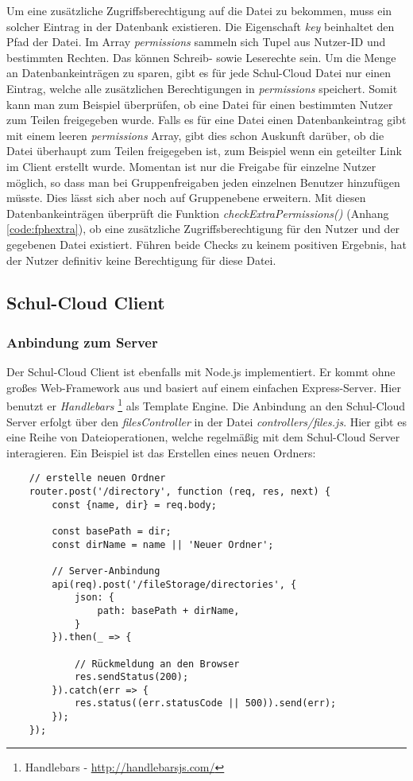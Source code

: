 Um eine zusätzliche Zugriffsberechtigung auf die Datei zu bekommen, muss ein solcher Eintrag in der Datenbank existieren. Die Eigenschaft \textit{key} beinhaltet den Pfad der Datei. Im Array \textit{permissions} sammeln sich Tupel aus Nutzer-ID und bestimmten Rechten. Das können Schreib- sowie Leserechte sein. Um die Menge an Datenbankeinträgen zu sparen, gibt es für jede Schul-Cloud Datei nur einen Eintrag, welche alle zusätzlichen Berechtigungen in \textit{permissions} speichert. Somit kann man zum Beispiel überprüfen, ob eine Datei für einen bestimmten Nutzer zum Teilen freigegeben wurde. Falls es für eine Datei einen Datenbankeintrag gibt mit einem leeren \textit{permissions} Array, gibt dies schon Auskunft darüber, ob die Datei überhaupt zum Teilen freigegeben ist, zum Beispiel wenn ein geteilter Link im Client erstellt wurde. Momentan ist nur die Freigabe für einzelne Nutzer möglich, so dass man bei Gruppenfreigaben jeden einzelnen Benutzer hinzufügen müsste. Dies lässt sich aber noch auf Gruppenebene erweitern. Mit diesen Datenbankeinträgen überprüft die Funktion \textit{checkExtraPermissions()} (Anhang \ref{code:fphextra}), ob eine zusätzliche Zugriffsberechtigung für den Nutzer und der gegebenen Datei existiert. Führen beide Checks zu keinem positiven Ergebnis, hat der Nutzer definitiv keine Berechtigung für diese Datei.

\subsection{Schul-Cloud Client}

\subsubsection{Anbindung zum Server}
Der Schul-Cloud Client ist ebenfalls mit Node.js implementiert. Er kommt ohne großes Web-Framework aus und basiert auf einem einfachen Express-Server. Hier benutzt er \textit{Handlebars} \footnote{Handlebars - \url{http://handlebarsjs.com/}} als Template Engine. Die Anbindung an den Schul-Cloud Server erfolgt über den \textit{filesController} in der  Datei \textit{controllers/files.js}. Hier gibt es eine Reihe von Dateioperationen, welche regelmäßig mit dem Schul-Cloud Server interagieren. Ein Beispiel ist das Erstellen eines neuen Ordners:

\begin{lstlisting}
	// erstelle neuen Ordner
	router.post('/directory', function (req, res, next) {
		const {name, dir} = req.body;
	
		const basePath = dir;
		const dirName = name || 'Neuer Ordner';
		
		// Server-Anbindung
		api(req).post('/fileStorage/directories', {
			json: {
				path: basePath + dirName,
			}
		}).then(_ => {
			
			// Rückmeldung an den Browser
			res.sendStatus(200);
		}).catch(err => {
			res.status((err.statusCode || 500)).send(err);
		});
	});
\end{lstlisting} 

